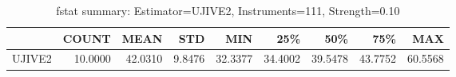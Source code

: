 \begin{table}[ht]
\centering
\caption{fstat summary: Estimator=UJIVE2, Instruments=111, Strength=0.10}
\begin{tabular}{lrrrrrrrr}
\toprule
 & COUNT & MEAN & STD & MIN & 25\% & 50\% & 75\% & MAX \\
\midrule
UJIVE2 & 10.0000 & 42.0310 & 9.8476 & 32.3377 & 34.4002 & 39.5478 & 43.7752 & 60.5568 \\
\bottomrule
\end{tabular}
\end{table}
